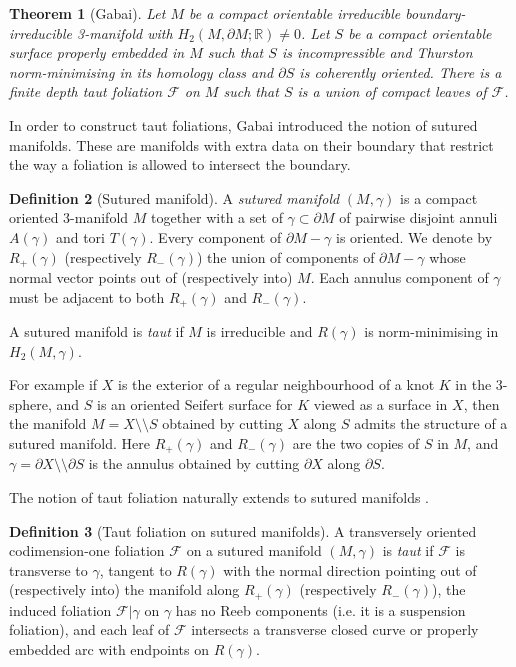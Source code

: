 \documentclass[11pt]{amsart}
\newtheorem{thm}{Theorem}[section]
\theoremstyle{remark}
\theoremstyle{definition}
\newtheorem{definition}[thm]{Definition}
\begin{document}
	\begin{thm}[Gabai]
		Let $M$ be a compact orientable irreducible boundary-irreducible 3-manifold with $H_2(M , \partial M ; \mathbb{R}) \neq 0$. Let $S$ be a compact orientable surface properly embedded in $M$ such that $S$ is incompressible and Thurston norm-minimising in its homology class and $\partial S$ is coherently oriented. There is a finite depth taut foliation $\mathcal{F}$ on $M$ such that $S$ is a union of compact leaves of $\mathcal{F}$.
		\label{thm:norm-minimising surfaces are leaves}
	\end{thm}
	
	In order to construct taut foliations, Gabai \cite{gabai1983foliations} introduced the notion of sutured manifolds. These are manifolds with extra data on their boundary that restrict the way a foliation is allowed to intersect the boundary. 
	
	\begin{definition}[Sutured manifold]
		A \emph{sutured manifold} $(M, \gamma)$ is a compact oriented 3-manifold $M$ together with a set of $\gamma \subset \partial M$ of pairwise disjoint annuli $A(\gamma)$ and tori $T(\gamma)$. Every component of $\partial M - \gamma$ is oriented. We denote by $R_+(\gamma)$ (respectively $R_-(\gamma)$) the union of components of $\partial M - \gamma$ whose normal vector points out of (respectively into) $M$. Each annulus component of $\gamma$ must be adjacent to both $R_+(\gamma)$ and $R_-(\gamma)$. 
		
		A sutured manifold is \emph{taut} if $M$ is irreducible and $R(\gamma)$ is norm-minimising in $H_2(M , \gamma)$. 
	\end{definition}

For example if $X$ is the exterior of a regular neighbourhood of a knot $K$ in the 3-sphere, and $S$ is an oriented Seifert surface for $K$ viewed as a surface in $X$, then the manifold $M = X \setminus \setminus S$ obtained by cutting $X$ along $S$ admits the structure of a sutured manifold. Here $R_+(\gamma)$ and $R_-(\gamma)$ are the two copies of $S$ in $M$, and $\gamma = \partial X \setminus \setminus \partial S$ is the annulus obtained by cutting $\partial X$ along $\partial S$. 

The notion of taut foliation naturally extends to sutured manifolds \cite{gabai1983foliations}. 

\begin{definition}[Taut foliation on sutured manifolds]
	A transversely oriented codimension-one foliation $\mathcal{F}$ on a sutured manifold $(M, \gamma)$ is \emph{taut} if $\mathcal{F}$ is transverse to $\gamma$, tangent to $R(\gamma)$ with the normal direction pointing out of (respectively into) the manifold along $R_+(\gamma)$ (respectively $R_-(\gamma)$), the induced foliation $\mathcal{F}|\gamma$ on $\gamma$ has no Reeb components (i.e. it is a suspension foliation), and each leaf of $\mathcal{F}$ intersects a transverse closed curve or properly embedded arc with endpoints on $R(\gamma)$. 
\end{definition}
\end{document}

